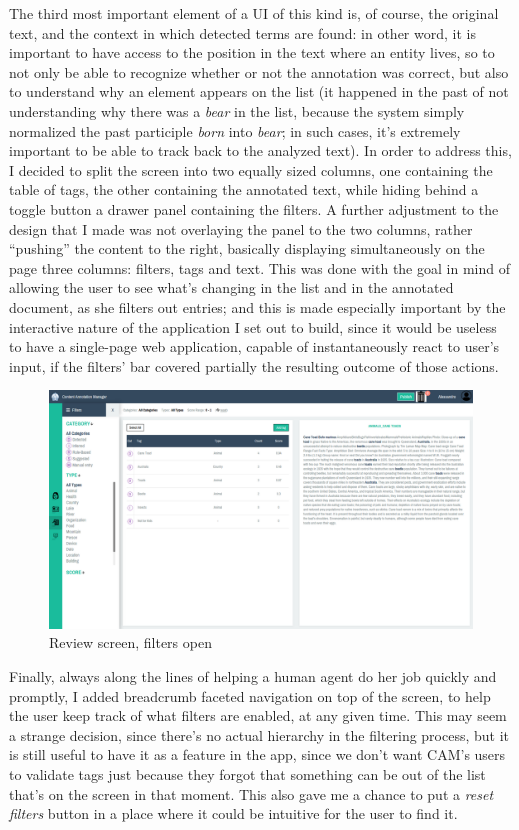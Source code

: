 \documentclass[12pt,oneside,svgnames]{memoir}
\begin{document}
The third most important element of a UI of this kind is, of course, the
original text, and the context in which detected terms are found: in
other word, it is important to have access to the position in the text
where an entity lives, so to not only be able to recognize whether or
not the annotation was correct, but also to understand why an element
appears on the list (it happened in the past of not understanding why
there was a \emph{bear} in the list, because the system simply
normalized the past participle \emph{born} into \emph{bear}; in such
cases, it's extremely important to be able to track back to the analyzed
text). In order to address this, I decided to split the screen into two
equally sized columns, one containing the table of tags, the other
containing the annotated text, while hiding behind a toggle button a
drawer panel containing the filters. A further adjustment to the design
that I made was not overlaying the panel to the two columns, rather
``pushing'' the content to the right, basically displaying
simultaneously on the page three columns: filters, tags and text. This
was done with the goal in mind of allowing the user to see what's
changing in the list and in the annotated document, as she filters out
entries; and this is made especially important by the interactive nature
of the application I set out to build, since it would be useless to have
a single-page web application, capable of instantaneously react to
user's input, if the filters' bar covered partially the resulting
outcome of those actions.

\begin{figure}[htbp]
\centering
\includegraphics{./src/img/review-open.png}
\caption{Review screen, filters open}
\end{figure}

Finally, always along the lines of helping a human agent do her job
quickly and promptly, I added breadcrumb faceted navigation on top of
the screen, to help the user keep track of what filters are enabled, at
any given time. This may seem a strange decision, since there's no
actual hierarchy in the filtering process, but it is still useful to
have it as a feature in the app, since we don't want CAM's users to
validate tags just because they forgot that something can be out of the
list that's on the screen in that moment. This also gave me a chance to
put a \emph{reset filters} button in a place where it could be intuitive
for the user to find it.
\end{document}

